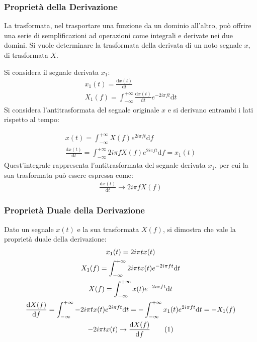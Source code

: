 \documentclass{article}
\newcommand{\df}{\mathrm{d}}
\newcommand{\tageq}{\tag{\stepcounter{equation}\theequation}}
\numberwithin{equation}{subsection}
\begin{document}
\subsubsection{Proprietà della Derivazione}

La trasformata, nel trasportare una funzione da un dominio all'altro, può offrire una serie di semplificazioni ad operazioni come integrali e derivate nei due domini. Si vuole 
determinare la trasformata della derivata di un noto segnale $x$, di trasformata $X$. 

Si considera il segnale derivata $x_1$:
\begin{gather*}
    x_1(t)=\displaystyle\frac{\df x(t)}{\df t}\\
    X_1(f)=\displaystyle\int_{-\infty}^{+\infty}\frac{\df x(t)}{\df t}e^{-2i\pi ft}\df t
\end{gather*}
Si considera l'antitrasformata del segnale originale $x$ e si derivano entrambi i lati rispetto al tempo: 

\begin{gather*}
    x(t)=\displaystyle\int_{-\infty}^{+\infty}X(f)e^{2i\pi ft}\df f\\
    \displaystyle\frac{\df x(t)}{\df t}=\int_{-\infty}^{+\infty}2i\pi fX(f)e^{2i\pi ft}\df f=x_1(t)
\end{gather*}
Quest'integrale rappresenta l'antitrasformata del segnale derivata $x_1$, per cui la sua trasformata può essere espressa come:
\begin{gather} 
    \displaystyle\frac{\df x(t)}{\df t}\to2i\pi fX(f)
\end{gather}

\subsubsection{Proprietà Duale della Derivazione}
Dato un segnale $x(t)$ e la sua trasformata $X(f)$, si dimostra che vale la proprietà duale della derivazione: 
\begin{gather*}
    x_1(t)=2i\pi tx(t)\\
    X_1(f)=\displaystyle\int_{-\infty}^{+\infty}2i\pi tx(t)e^{-2i\pi ft}\df t\\
    X(f)=\displaystyle\int_{-\infty}^{+\infty}x(t)e^{-2i\pi ft}\df t\\
    \displaystyle\frac{\df X(f)}{\df f}=\int_{-\infty}^{+\infty}-2i\pi t x(t)e^{2i\pi ft}\df t=-\int_{-\infty}^{+\infty}x_1(t)e^{2i\pi ft}\df t=-X_1(f)\\
    -2i\pi tx(t)\to\displaystyle\frac{\df X(f)}{\df f}\tageq
\end{gather*}
\end{document}
